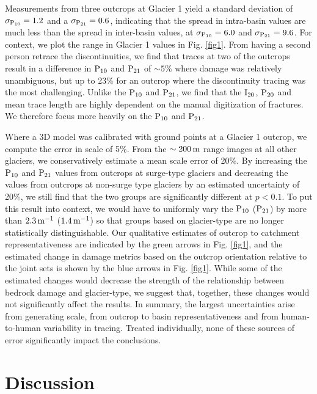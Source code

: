 \documentclass[review]{igs}
\begin{document}
Measurements from three outcrops at Glacier 1 yield a standard deviation of $\rm\sigma_{P_{10}} = 1.2$ and a $\rm\sigma_{P_{21}} = 0.6$, indicating that the spread in intra-basin values are much less than the spread in inter-basin values, at $\rm \sigma_{P_{10}} = 6.0$ and $\rm \sigma_{P_{21}} = 9.6$. For context, we plot the range in Glacier 1 values in Fig. \ref{fig1}. From having a second person retrace the discontinuities, we find that traces at two of the outcrops result in a difference in $\rm{P_{10}}$ and $\rm{P_{21}}$ of $\sim5\%$ where damage was relatively unambiguous, but up to 23\% for an outcrop where the discontinuity tracing was the most challenging. Unlike the $\rm{P_{10}}$ and $\rm{P_{21}}$, we find that the $\rm{I_{20}}$, $\rm{P_{20}}$ and mean trace length are highly dependent on the manual digitization of fractures. We therefore focus more heavily on the $\rm{P_{10}}$ and $\rm{P_{21}}$. 

Where a 3D model was calibrated with ground points at a Glacier 1 outcrop, we compute the error in scale of 5\%. From the $\rm \sim 200\,m$ range images at all other glaciers, we conservatively estimate a mean scale error of 20\%. By increasing the $\rm P_{10}$ and $\rm P_{21}$ values from outcrops at surge-type glaciers and decreasing the values from outcrops at non-surge type glaciers by an estimated uncertainty of 20\%, we still find that the two groups are significantly different at $p<0.1$. To put this result into context, we would have to uniformly vary the $\rm P_{10}$ ($\rm P_{21}$) by more than $\rm 2.3\,m^{-1}$ ($\rm 1.4\,m^{-1}$) so that groups based on glacier-type are no longer statistically distinguishable. Our qualitative estimates of outcrop to catchment representativeness are indicated by the green arrows in Fig. \ref{fig1}, and the estimated change in damage metrics based on the outcrop orientation relative to the joint sets is shown by the blue arrows in Fig. \ref{fig1}. While some of the estimated changes would decrease the strength of the relationship between bedrock damage and glacier-type, we suggest that, together, these changes would not significantly affect the results. In summary, the largest uncertainties arise from generating scale, from outcrop to basin representativeness and from human-to-human variability in tracing. Treated individually, none of these sources of error significantly impact the conclusions. 

\section{Discussion}
\end{document}
